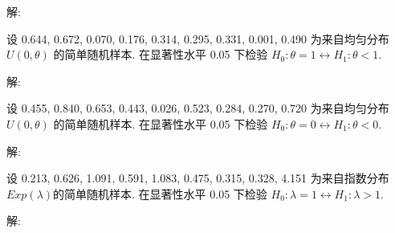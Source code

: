 \documentclass[standard]{ExBook}
\begin{document}
\begin{qitems}
\vspace{-5em}

    \begin{bbox}
解: 
    \end{bbox}

\vspace{-5em}

    \begin{bbox}
    \begin{shaded}
        \qitem
设 0.644, 0.672, 0.070, 0.176, 0.314, 0.295, 0.331, 0.001, 0.490 为来自均匀分布 $U(0,\theta)$ 的简单随机样本. 在显著性水平 0.05 下检验 $H_0 : \theta=1 \longleftrightarrow H_1 : \theta<1$.
    \end{shaded}
    \end{bbox}

\vspace{-5em}

    \begin{bbox}
解: 
    \end{bbox}

\vspace{-5em}

    \begin{bbox}
    \begin{shaded}
        \qitem
设 0.455, 0.840, 0.653, 0.443, 0.026, 0.523, 0.284, 0.270, 0.720 为来自均匀分布 $U(0,\theta)$ 的简单随机样本. 在显著性水平 0.05 下检验 $H_0 : \theta=0 \longleftrightarrow H_1 : \theta<0$.
    \end{shaded}
    \end{bbox}

\vspace{-5em}

    \begin{bbox}
解: 
    \end{bbox}

\vspace{-5em}

    \begin{bbox}
    \begin{shaded}
        \qitem
设 0.213, 0.626, 1.091, 0.591, 1.083, 0.475, 0.315, 0.328, 4.151 为来自指数分布$Exp(\lambda)$的简单随机样本. 在显著性水平 0.05 下检验 $H_0 : \lambda=1 \longleftrightarrow H_1 : \lambda>1$.
    \end{shaded}
    \end{bbox}

\vspace{-5em}

    \begin{bbox}
解: 
    \end{bbox}


\end{qitems}
\end{document}
